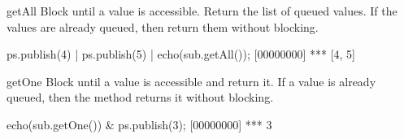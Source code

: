 \begin{urbiscriptapi}
\item[getAll] Block until a value is accessible.  Return the list of
  queued values.  If the values are already queued, then return them
  without blocking.

\begin{urbiscript}
ps.publish(4) |
ps.publish(5) |
echo(sub.getAll());
[00000000] *** [4, 5]
\end{urbiscript}


\item[getOne]
  Block until a value is accessible and return it.  If a value is already
  queued, then the method returns it without blocking.

\begin{urbiscript}
echo(sub.getOne()) &
ps.publish(3);
[00000000] *** 3
\end{urbiscript}


\end{urbiscriptapi}

